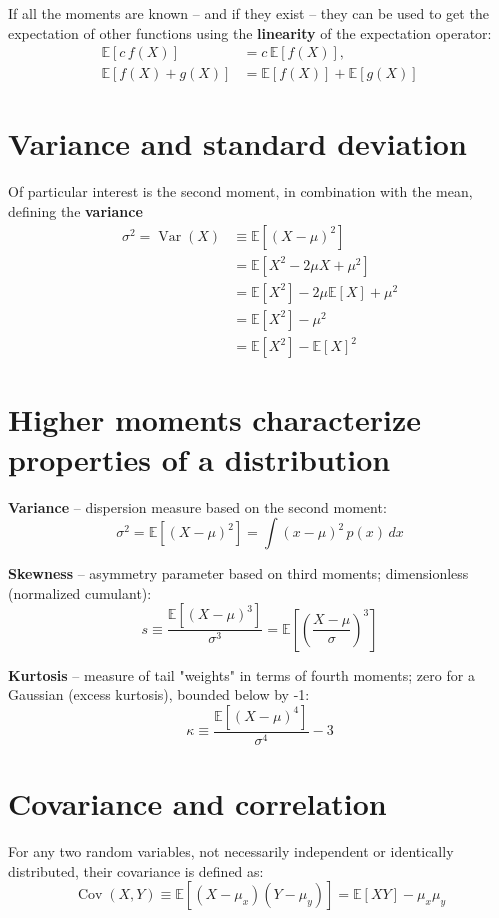 \documentclass{article}
\begin{document}
If all the moments are known -- and if they exist -- they can be used to get the expectation of other functions using the \textbf{linearity} of the expectation operator:
\begin{align*}
\mathbb{E}[c\,f(X)] &= c\,\mathbb{E}[f(X)], \\
\mathbb{E}[f(X) + g(X)] &= \mathbb{E}[f(X)] + \mathbb{E}[g(X)]
\end{align*}

\section*{Variance and standard deviation}
Of particular interest is the second moment, in combination with the mean, defining the \textbf{variance}
\begin{align*}
\sigma^2 = \operatorname{Var}(X) &\equiv \mathbb{E}\left[(X - \mu)^2\right] \\
&= \mathbb{E}\left[X^2 - 2\mu X + \mu^2\right] \\
&= \mathbb{E}\left[X^2\right] - 2\mu \mathbb{E}[X] + \mu^2 \\
&= \mathbb{E}\left[X^2\right] - \mu^2 \\
&= \mathbb{E}\left[X^2\right] - \mathbb{E}[X]^2
\end{align*}
\section*{Higher moments characterize properties of a distribution}
\textbf{Variance} -- dispersion measure based on the second moment:
\[
\sigma^2 = \mathbb{E}\left[(X-\mu)^2\right] = \int (x-\mu)^2\,p(x)\,dx
\]

\noindent\textbf{Skewness} -- asymmetry parameter based on third moments; dimensionless (normalized cumulant):
\[
s \equiv \frac{\mathbb{E}\left[(X-\mu)^3\right]}{\sigma^3} = \mathbb{E}\left[\left(\frac{X-\mu}{\sigma}\right)^3\right]
\]

\noindent\textbf{Kurtosis} -- measure of tail "weights" in terms of fourth moments; zero for a Gaussian (excess kurtosis), bounded below by -1:
\[
\kappa \equiv \frac{\mathbb{E}\left[(X-\mu)^4\right]}{\sigma^4} - 3
\]

\section*{Covariance and correlation}
For any two random variables, not necessarily independent or identically distributed, their covariance is defined as:
\[
\operatorname{Cov}(X,Y) \equiv \mathbb{E}[(X - \mu_x)(Y - \mu_y)] = \mathbb{E}[XY] - \mu_x\mu_y
\]
\end{document}
